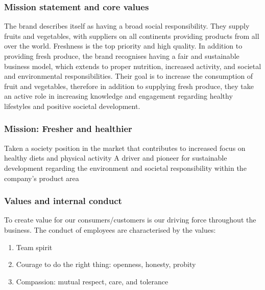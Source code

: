 \vspace{2,5mm}
    
        \subsubsection{Mission statement and core values}
 
        The brand describes itself as having a broad social responsibility. They supply fruits and vegetables, with suppliers on all continents providing products from all over the world. Freshness is the top priority and high quality. In addition to providing fresh produce, the brand recognises having a fair and sustainable business model, which extends to proper nutrition, increased activity, and societal and environmental responsibilities. Their goal is to increase the consumption of fruit and vegetables, therefore in addition to supplying fresh produce, they take an active role in increasing knowledge and engagement regarding healthy lifestyles and positive societal development.
 
\vspace{2,5mm}
  
        \subsubsection{Mission: Fresher and healthier}
        Taken a society position in the  market that contributes to increased focus on healthy diets and physical activity
        A driver and pioneer for sustainable development regarding the environment and societal responsibility within the company’s product area
        
\vspace{2,5mm}

        \subsubsection{Values and internal conduct}
        
        To create value for our consumers/customers is our driving force throughout the business. The conduct of employees are characterised by the values:
        
        \begin{enumerate}
            \item Team spirit
            \item Courage to do the right thing: openness, honesty, probity
            \item Compassion: mutual respect, care, and tolerance
        \end{enumerate}


